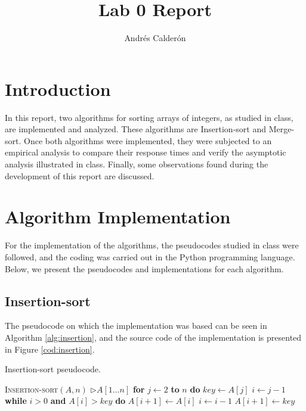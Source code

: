 \documentclass[11pt]{article}
\title{Lab 0 Report}
\author{Andrés Calderón}
\begin{document}
\maketitle

\section{Introduction}
In this report, two algorithms for sorting arrays of integers, as studied in class, are implemented and analyzed. These algorithms are Insertion-sort and Merge-sort. Once both algorithms were implemented, they were subjected to an empirical analysis to compare their response times and verify the asymptotic analysis illustrated in class. Finally, some observations found during the development of this report are discussed.

\section{Algorithm Implementation}
For the implementation of the algorithms, the pseudocodes studied in class were followed, and the coding was carried out in the Python programming language. Below, we present the pseudocodes and implementations for each algorithm.

\subsection{Insertion-sort}
The pseudocode on which the implementation was based can be seen in Algorithm \ref{alg:insertion}, and the source code of the implementation is presented in Figure \ref{cod:insertion}.

\begin{algorithm}
    \caption{Insertion-sort pseudocode.}
    \begin{algorithmic}[1]
        \STATE \textsc{Insertion-sort}$(A, n)$ \hspace{5mm} $\rhd A[1 \ldots n]$
        \STATE \hspace{1em} \textbf{for} $j \leftarrow 2$ \textbf{to} $n$ \textbf{do}
        \STATE \hspace{2em} $key \leftarrow A[j]$
        \STATE \hspace{2em} $i \leftarrow j - 1$
        \STATE \hspace{2em} \textbf{while} $i > 0$ \textbf{and} $A[i] > key$ \textbf{do}
        \STATE \hspace{3em} $A[i + 1] \leftarrow A[i]$
        \STATE \hspace{3em} $i \leftarrow i - 1$
        \STATE \hspace{2em} $A[i + 1] \leftarrow key$
    \end{algorithmic}
    \label{alg:insertion}
\end{algorithm}
\end{document}
